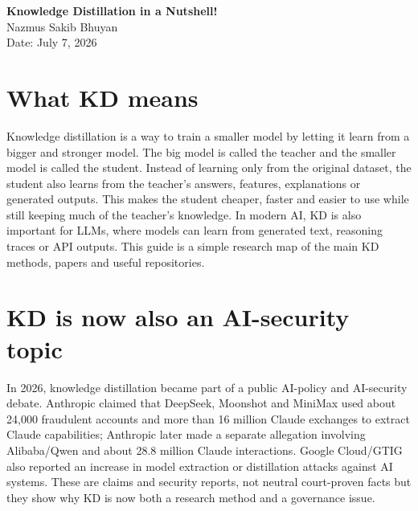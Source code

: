 \documentclass[10pt]{article}
\begin{document}
\begin{center}
{\LARGE\bfseries Knowledge Distillation in a Nutshell!}\\[6pt]
{\large Nazmus Sakib Bhuyan}\\[4pt]
Date: July 7, 2026
\end{center}

\vspace{4pt}

\section*{What KD means}

Knowledge distillation is a way to train a smaller model by letting it learn from a bigger and stronger model. The big model is called the teacher and the smaller model is called the student. Instead of learning only from the original dataset, the student also learns from the teacher's answers, features, explanations or generated outputs. This makes the student cheaper, faster and easier to use while still keeping much of the teacher's knowledge. In modern AI, KD is also important for LLMs, where models can learn from generated text, reasoning traces or API outputs. This guide is a simple research map of the main KD methods, papers and useful repositories.\par


\section*{ KD is now also an AI-security topic}
In 2026, knowledge distillation became part of a public AI-policy and AI-security debate. Anthropic claimed that DeepSeek, Moonshot and MiniMax used about 24,000 fraudulent accounts and more than 16 million Claude exchanges to extract Claude capabilities; Anthropic later made a separate allegation involving Alibaba/Qwen and about 28.8 million Claude interactions. Google Cloud/GTIG also reported an increase in model extraction or distillation attacks against AI systems. These are claims and security reports, not neutral court-proven facts but they show why KD is now both a research method and a governance issue.\par
\end{document}
